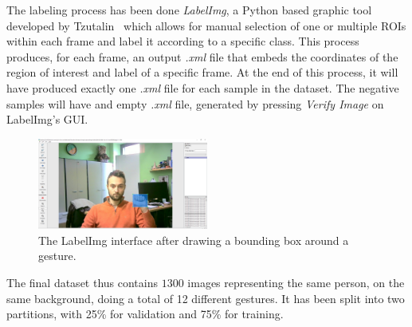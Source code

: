 \documentclass[10pt,twocolumn,letterpaper]{article}
\begin{document}
\begin{flushleft}
The labeling process has been done \textit{LabelImg}, a Python based graphic tool developed by Tzutalin~\cite{tzutalin2015labelimg} which allows for manual selection of one or multiple ROIs within each frame and label it according to a specific class.
This process produces, for each frame, an output \textit{.xml} file that embeds the coordinates of the region of interest and label of a specific frame. At the end of this process, it will have produced exactly one \textit{.xml} file for each sample in the dataset. The negative samples will have and empty \textit{.xml} file, generated by pressing \textit{Verify Image} on LabelImg's GUI.\linebreak

\begin{figure}[!h]
    \centering
    \includegraphics[width=0.5\textwidth]{resources/image/labelImgScreenshot.PNG} \caption{The LabelImg interface after drawing a bounding box around a gesture.}
\end{figure}

The final dataset thus contains $1300$ images representing the same person, on the same background, doing a total of 12 different gestures. It has been split into two partitions, with 25\% for validation and 75\% for training.
\end{flushleft}
\end{document}
